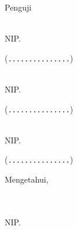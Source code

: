 \begin{center}
	\vspace{0.75em}

	Penguji

	\vspace{0.75em}

	\begin{minipage}{0.875\linewidth}
		\begin{minipage}{0.6\linewidth}
			\examinerOne \\
			NIP. \examinerOneId
		\end{minipage}
		\hfill
		\begin{minipage}{0.275\linewidth}
			\begin{flushright}
				(\texttt{...............})
			\end{flushright}
		\end{minipage}
	\end{minipage}

	\vspace{0.75em}

	\begin{minipage}{0.875\linewidth}
		\begin{minipage}{0.6\linewidth}
			\examinerTwo \\
			NIP. \examinerTwoId
		\end{minipage}
		\hfill
		\begin{minipage}{0.275\linewidth}
			\begin{flushright}
				(\texttt{...............})
			\end{flushright}
		\end{minipage}
	\end{minipage}

	\vspace{0.75em}

	\begin{minipage}{0.875\linewidth}
		\begin{minipage}{0.6\linewidth}
			\examinerThree \\
			NIP. \examinerThreeId
		\end{minipage}
		\hfill
		\begin{minipage}{0.275\linewidth}
			\begin{flushright}
				(\texttt{...............})
			\end{flushright}
		\end{minipage}
	\end{minipage}
\end{center}

\vspace{1.25em}

\hfill
\begin{minipage}{0.6\linewidth}
	\centering
	Mengetahui, \\
	\departmentHeadTitle \\
	\facultyNameBahasa

	\vspace{4em}

	\uline{\departmentHead} \\
	NIP. \departmentHeadId
\end{minipage}
